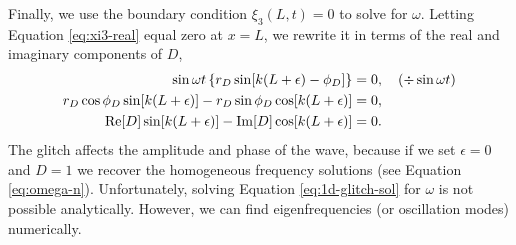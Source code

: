 Finally, we use the boundary condition \(\xi_3(L, t) = 0\) to solve for \(\omega\). Letting Equation \ref{eq:xi3-real} equal zero at \(x=L\), we rewrite it in terms of the real and imaginary components of \(D\),
%
\begin{align}
    \sin \omega t \left\{r_D \sin[k(L + \epsilon) - \phi_D]\right\} &= 0, \quad (\div \sin \omega t) \notag \\
    r_D \cos \phi_D \sin[k(L + \epsilon)] - r_D \sin \phi_D \cos[k(L + \epsilon)] &= 0, \notag \\
    {\mathrm{Re}}[D] \sin[k(L + \epsilon)] - {\mathrm{Im}}[D] \cos[k(L + \epsilon)] &=0. \label{eq:1d-glitch-sol}
\end{align}
%
The glitch affects the amplitude and phase of the wave, because if we set \(\epsilon = 0\) and \(D = 1\) we recover the homogeneous frequency solutions (see Equation \ref{eq:omega-n}). Unfortunately, solving Equation \ref{eq:1d-glitch-sol} for \(\omega\) is not possible analytically. However, we can find eigenfrequencies (or oscillation modes) numerically.

